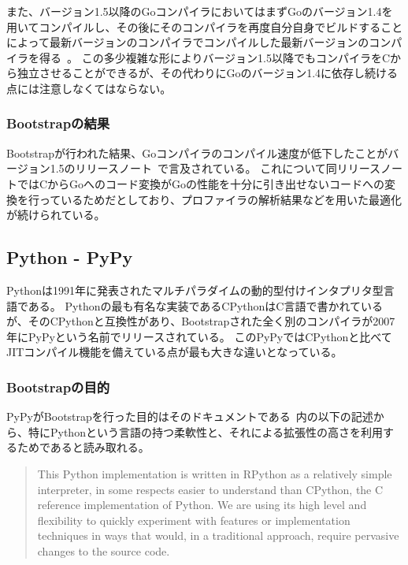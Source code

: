 また、バージョン1.5以降のGoコンパイラにおいてはまずGoのバージョン1.4を用いてコンパイルし、その後にそのコンパイラを再度自分自身でビルドすることによって最新バージョンのコンパイラでコンパイルした最新バージョンのコンパイラを得る~\cite{go-bootstrap-plan}。
この多少複雑な形によりバージョン1.5以降でもコンパイラをCから独立させることができるが、その代わりにGoのバージョン1.4に依存し続ける点には注意しなくてはならない。

\subsubsection{Bootstrapの結果}

Bootstrapが行われた結果、Goコンパイラのコンパイル速度が低下したことがバージョン1.5のリリースノート~\cite{go-15-release}で言及されている。
これについて同リリースノートではCからGoへのコード変換がGoの性能を十分に引き出せないコードへの変換を行っているためだとしており、プロファイラの解析結果などを用いた最適化が続けられている。


\subsection{Python - PyPy}
\label{side-effect:instance:python}

Pythonは1991年に発表されたマルチパラダイムの動的型付けインタプリタ型言語である。
Pythonの最も有名な実装であるCPythonはC言語で書かれているが、そのCPythonと互換性があり、Bootstrapされた全く別のコンパイラが2007年にPyPyという名前でリリースされている。
このPyPyではCPythonと比べてJITコンパイル機能を備えている点が最も大きな違いとなっている。~\cite{pypy}

\subsubsection{Bootstrapの目的}

PyPyがBootstrapを行った目的はそのドキュメントである~\cite{pypy-doc}内の以下の記述から、特にPythonという言語の持つ柔軟性と、それによる拡張性の高さを利用するためであると読み取れる。

\begin{quotation}
This Python implementation is written in RPython as a relatively simple interpreter, in some respects easier to understand than CPython, the C reference implementation of Python. We are using its high level and flexibility to quickly experiment with features or implementation techniques in ways that would, in a traditional approach, require pervasive changes to the source code.
\end{quotation}


